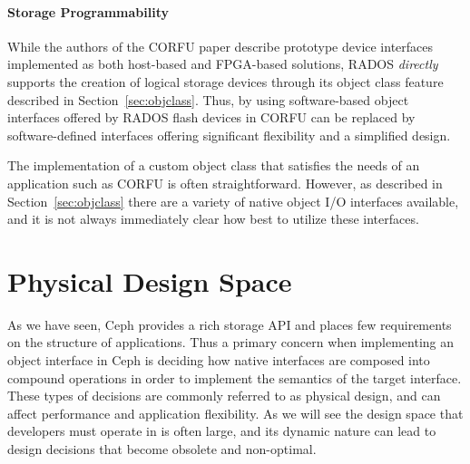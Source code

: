 \documentclass[10pt,twocolumn]{article}
\begin{document}
\paragraph*{Storage Programmability}
While the authors of the CORFU paper describe prototype device interfaces
implemented as both host-based and FPGA-based solutions, RADOS \emph{directly} supports
the creation of logical storage devices through its object class feature
described in Section~\ref{sec:objclass}. Thus, by using
software-based object interfaces offered by RADOS flash devices in CORFU can be
replaced by software-defined interfaces offering significant flexibility and a
simplified design.

The implementation of a custom object class that satisfies the needs of an
application such as CORFU is often straightforward. However, as described in
Section~\ref{sec:objclass} there are a variety of native object I/O interfaces
available, and it is not always immediately clear how best to utilize these
interfaces.

\section{Physical Design Space}

As we have seen, Ceph provides a rich storage API and places few requirements
on the structure of applications. Thus a primary concern when implementing an
object interface in Ceph is deciding how native interfaces are composed into
compound operations in order to implement the semantics of the target
interface. These types of decisions are commonly referred to as
physical design, and can affect performance and application flexibility.
As we will see the design space that developers must operate in is often
large, and its dynamic nature can lead to design decisions that become
obsolete and non-optimal.
\end{document}
